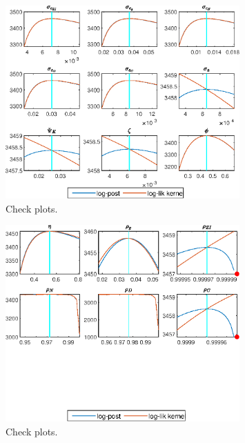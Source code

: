  
\begin{figure}[H]
\centering 
\includegraphics[width=0.80\textwidth]{BRS_growth_ext_util/graphs/BRS_growth_ext_util_CheckPlots1}
\caption{Check plots.}\label{Fig:CheckPlots:1}
\end{figure}
 
\begin{figure}[H]
\centering 
\includegraphics[width=0.80\textwidth]{BRS_growth_ext_util/graphs/BRS_growth_ext_util_CheckPlots2}
\caption{Check plots.}\label{Fig:CheckPlots:2}
\end{figure}
 
